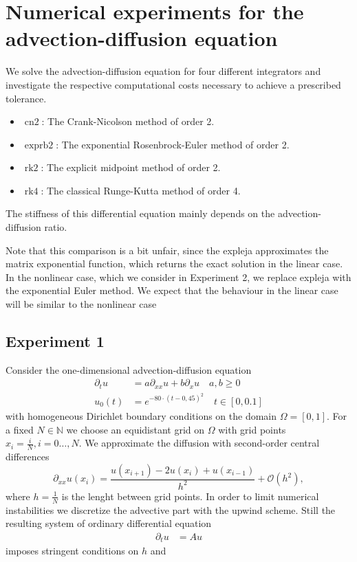 \documentclass{scrartcl}
\begin{document}
\section{Numerical experiments for the advection-diffusion equation}
We solve the advection-diffusion equation for four different integrators and investigate the respective computational costs necessary to achieve a prescribed tolerance. 

\begin{itemize}
	\item $\operatorname{cn2}$: The Crank-Nicolson method of order 2.
	\item $\operatorname{exprb2}$: The exponential Rosenbrock-Euler method of order 2.
	\item $\operatorname{rk2}$: The explicit midpoint method of order 2. 
	\item $\operatorname{rk4}$: The classical Runge-Kutta method of order 4.
\end{itemize}

The stiffness of this differential equation mainly depends on the advection-diffusion ratio.   

Note that this comparison is a bit unfair, since the expleja approximates the matrix exponential function, which  returns the exact solution in the linear case. In the nonlinear case, which we consider in Experiment 2, we replace expleja with the exponential Euler method. We expect that the behaviour in the linear case will be similar to the nonlinear case

\subsection{Experiment 1}
Consider the one-dimensional advection-diffusion equation
\begin{align*}
\partial_tu &= a\partial_{xx}u + b\partial_xu \quad a,b\ge 0\\
u_0(t) &= e^{-80\cdot(t-0,45)^2} \quad t\in[0,0.1]
\end{align*}
with homogeneous Dirichlet boundary conditions on the domain $\Omega = [0,1]$. For a fixed $N\in\mathbb N$ we choose an equidistant grid on $\Omega$ with grid points $x_i = \frac{i}{N}, i=0\dots,N$. We approximate the diffusion with second-order central differences
\[\partial_{xx}u(x_i) = \frac{u(x_{i+1}) - 2u(x_i) + u(x_{i-1})}{h^2} + \mathcal{O}(h^2),\]
where $h = \frac{1}{N}$ is the lenght between grid points. In order to limit numerical instabilities we discretize the advective part with the upwind scheme.
Still the resulting system of ordinary differential equation 
\begin{align*}
\partial_tu &= Au
\end{align*}
imposes stringent conditions on $h$ and  
\end{document}
